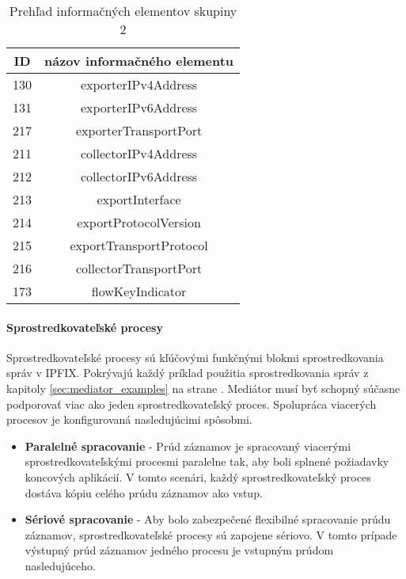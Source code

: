 \tabcolsep=8pt
\begin{table}[!ht]\caption{Prehľad informačných elementov skupiny 2}\label{t:ie-group2}
\smallskip
\centering
\begin{tabular}{|c|c|}
\hline
\textbf{ID} & \textbf{názov informačného elementu} \\ \hline
130 & exporterIPv4Address \\ \hline
131 & exporterIPv6Address \\ \hline
217 & exporterTransportPort \\ \hline
211 & collectorIPv4Address \\ \hline
212 & collectorIPv6Address \\ \hline
213 & exportInterface \\ \hline
214 & exportProtocolVersion \\ \hline
215 & exportTransportProtocol \\ \hline
216 & collectorTransportPort \\ \hline
173 & flowKeyIndicator \\ \hline
\end{tabular}
\end{table}

\paragraph{Sprostredkovateľské procesy} \label{sec:framework_intermediate}

Sprostredkovateľské procesy sú kľúčovými funkčnými blokmi sprostredkovania správ v IPFIX. Pokrývajú 
každý príklad použitia sprostredkovania správ z kapitoly \ref{sec:mediator_examples} na strane 
\pageref{sec:mediator_examples}. 
Mediátor musí byť schopný súčasne podporovať viac ako jeden sprostredkovateľský proces. Spolupráca viacerých 
procesov je konfigurovaná nasledujúcimi spôsobmi.

\begin{itemize}
 \item \textbf{Paralelné spracovanie} - Prúd záznamov je spracovaný viacerými sprostredkovateľskými procesmi 
 paralelne tak, aby boli splnené požiadavky koncových aplikácií. V tomto scenári, každý 
 sprostredkovateľský proces dostáva kópiu celého prúdu záznamov ako vstup.
 \item \textbf{Sériové spracovanie} - Aby bolo zabezpečené flexibilné spracovanie prúdu záznamov, sprostredkovateľské
 procesy sú zapojene sériovo. V tomto prípade výstupný prúd záznamov jedného procesu je vstupným prúdom 
 nasledujúceho.
\end{itemize}






















